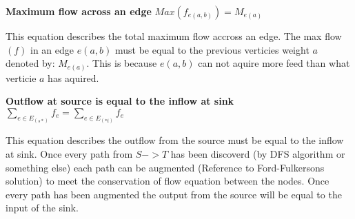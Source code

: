 \documentclass[11pt, oneside]{article}
\begin{document}
\begin{enumerate}
	\begin{center}
		\textbf{Maximum flow across an edge}
		\linebreak
		\linebreak
		$Max(f_{e(a,b)}) = M_{e(a)}$ 
	\end{center}

	This equation describes the total maximum flow accross an edge. The max flow $(f)$ in an edge $e(a,b)$ must be equal to the previous verticies weight $a$ denoted by: $M_{e(a)}$. This is because $e(a,b)$ can not aquire more feed than what verticie $a$ has aquired.
	\linebreak
	
	\begin{center}
		\textbf{Outflow at source is equal to the inflow at sink}
		\linebreak
		\linebreak
		$\displaystyle\sum_{e \in E_{(s*)}}f_e = \displaystyle\sum_{e \in E_{(*t)}}f_e$ 
	\end{center}

	This equation describes the outflow from the source must be equal to the inflow at sink. Once every path from $S -> T$ has been discoverd (by DFS algorithm or something else) each path can be augmented (Reference to Ford-Fulkersons solution) to meet the conservation of flow equation between the nodes. Once every path has been augmented the output from the source will be equal to the input of the sink.


\end{enumerate}
\end{document}
